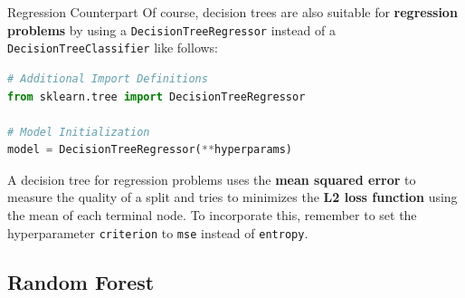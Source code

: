 \documentclass[document.tex]{subfiles}
\begin{document}
    \begin{frame}[fragile]{Regression Counterpart}
        Of course, decision trees are also suitable for \textbf{regression problems} by using a \verb|DecisionTreeRegressor| instead of a \verb|DecisionTreeClassifier| like follows:

        \begin{lstlisting}[language=Python, style=material]
# Additional Import Definitions
from sklearn.tree import DecisionTreeRegressor

# Model Initialization
model = DecisionTreeRegressor(**hyperparams)
        \end{lstlisting}

        A decision tree for regression problems uses the \textbf{mean squared error} to measure the quality of a split and tries to minimizes the \textbf{L2 loss function} using the mean of each terminal node. To incorporate this, remember to set the hyperparameter \verb|criterion| to \verb|mse| instead of \verb|entropy|.
    \end{frame}

    \subsection{Random Forest}
\end{document}
